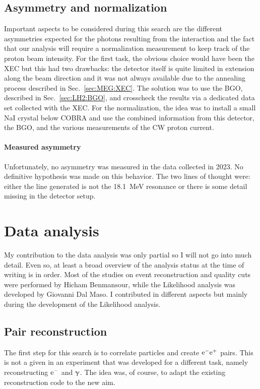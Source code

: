 \begin{refsection}
    \subsection{Asymmetry and normalization}
        Important aspects to be considered during this search are the different asymmetries expected for the photons resulting from the interaction and the fact that our analysis will require a normalization measurement to keep track of the proton beam intensity.
        For the first task, the obvious choice would have been the XEC but this had two drawbacks: the detector itself is quite limited in extension along the beam direction and it was not always available due to the annealing process described in Sec.~\ref{sec:MEG:XEC}.
        The solution was to use the BGO, described in Sec.~\ref{sec:LH2:BGO}, and crosscheck the results via a dedicated data set collected with the XEC.
        For the normalization, the idea was to install a small NaI crystal below COBRA and use the combined information from this detector, the BGO, and the various measurements of the CW proton current.

        \paragraph{Measured asymmetry}
        Unfortunately, no asymmetry was measured in the data collected in 2023.
        No definitive hypothesis was made on this behavior.
        The two lines of thought were: either the line generated is not the \SI{18.1}{MeV} resonance or there is some detail missing in the detector setup.
        
\section{Data analysis}
    My contribution to the data analysis was only partial so I will not go into much detail. 
    Even so, at least a broad overview of the analysis status at the time of writing is in order.
    Most of the studies on event reconstruction and quality cuts were performed by Hicham Benmansour, while the Likelihood analysis was developed by Giovanni Dal Maso. 
    I contributed in different aspects but mainly during the development of the Likelihood analysis.
    
    \subsection{Pair reconstruction}
        The first step for this search is to correlate particles and create $\text{e}^- \text{e}^+$ pairs. 
        This is not a given in an experiment that was developed for a different task, namely reconstructing $\text{e}^-$ and $\upgamma$. 
        The idea was, of course, to adapt the existing reconstruction code to the new aim.
        

\end{refsection}
